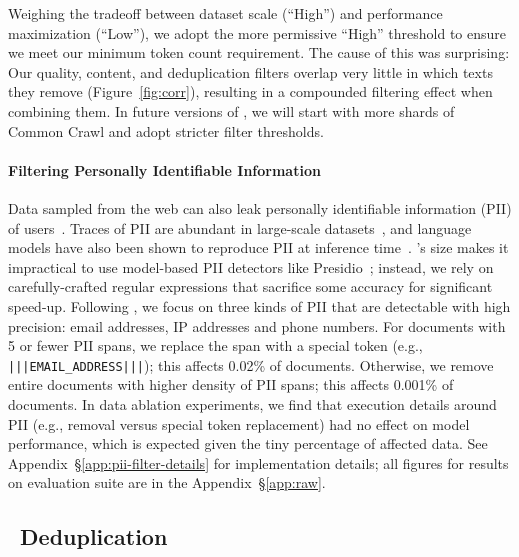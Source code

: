 Weighing the tradeoff between dataset scale (``High'') and performance maximization (``Low''), we adopt the more permissive ``High'' threshold to ensure we meet our minimum token count requirement.
The cause of this was surprising: Our quality, content, and deduplication filters overlap very little in which texts they remove (Figure~\ref{fig:corr}), resulting in a compounded filtering effect when combining them.
In future versions of \dolma, we will start with more shards of Common Crawl and adopt stricter filter thresholds.


\paragraph{Filtering Personally Identifiable Information}

Data sampled from the web can also leak personally identifiable information (PII) of users~\citep{luccioni-viviano-2021-whats,subramani-etal-2023-detecting}.
Traces of PII are abundant in large-scale datasets~\citep{wimbd}, and 
language models have also been shown to reproduce PII at inference time~\citep{Carlini2022-mj,Chen2023-zm}. 
\dolma's size makes it impractical to use model-based PII detectors like Presidio~\citep{presidio};
instead, we rely on carefully-crafted regular expressions that sacrifice some accuracy for significant speed-up.
Following \citet{subramani-etal-2023-detecting}, we focus on three kinds of PII that are detectable with high precision: 
email addresses, IP addresses and phone numbers.
For documents with 5 or fewer PII spans, we replace the span with a special token (e.g., \texttt{|\negthickspace|\negthickspace|EMAIL\_ADDRESS|\negthickspace|\negthickspace|}); this affects 0.02\% of documents.
Otherwise, we remove entire documents with higher density of PII spans; this affects 0.001\% of documents.
In data ablation experiments, we find that execution details around PII (e.g., removal versus special token replacement) had no effect on model performance, which is expected given the tiny percentage of affected data.
See Appendix~\S\ref{app:pii-filter-details} for implementation details; all figures for results on evaluation suite are in the Appendix~\S\ref{app:raw}.


    
    





\subsection{\toolkitDedupe~Deduplication} 
\label{sub:web:dedup}

